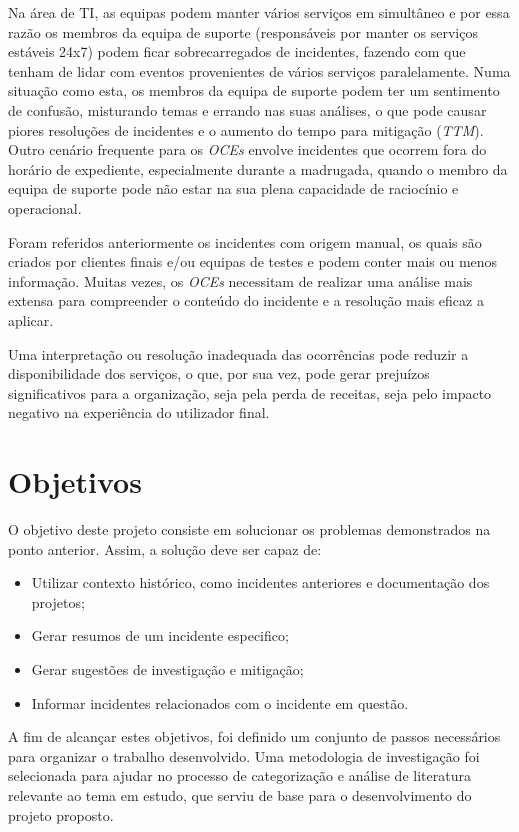 	Na área de \gls{TI}, as equipas podem manter vários serviços em simultâneo e por essa razão os membros da equipa de suporte (responsáveis por manter os serviços estáveis 24x7) podem ficar sobrecarregados de incidentes, fazendo com que tenham de lidar com eventos provenientes de vários serviços paralelamente. Numa situação como esta, os membros da equipa de suporte podem ter um sentimento de confusão, misturando temas e errando nas suas análises, o que pode causar piores resoluções de incidentes e o aumento do tempo para mitigação (\textit{\gls{TTM}}). Outro cenário frequente para os \textit{\gls{OCEs}} envolve incidentes que ocorrem fora do horário de expediente, especialmente durante a madrugada, quando o membro da equipa de suporte pode não estar na sua plena capacidade de raciocínio e operacional.
	
	Foram referidos anteriormente os incidentes com origem manual, os quais são criados por clientes finais e/ou equipas de testes e podem conter mais ou menos informação. Muitas vezes, os \textit{\gls{OCEs}} necessitam de realizar uma análise mais extensa para compreender o conteúdo do incidente e a resolução mais eficaz a aplicar.
	
	Uma interpretação ou resolução inadequada das ocorrências pode reduzir a disponibilidade dos serviços, o que, por sua vez, pode gerar prejuízos significativos para a organização, seja pela perda de receitas, seja pelo impacto negativo na experiência do utilizador final.

\section{Objetivos}

	O objetivo deste projeto consiste em solucionar os problemas demonstrados na ponto anterior. Assim, a solução deve ser capaz de:
	\begin{itemize}
		\item Utilizar contexto histórico, como incidentes anteriores e documentação dos projetos;
		\item Gerar resumos de um incidente especifico;
		\item Gerar sugestões de investigação e mitigação;
		\item Informar incidentes relacionados com o incidente em questão.
	\end{itemize}
	
	A fim de alcançar estes objetivos, foi definido um conjunto de passos necessários para organizar o trabalho desenvolvido. Uma metodologia de investigação foi selecionada para ajudar no processo de categorização e análise de literatura relevante ao tema em estudo, que serviu de base para o desenvolvimento do projeto proposto.
	

